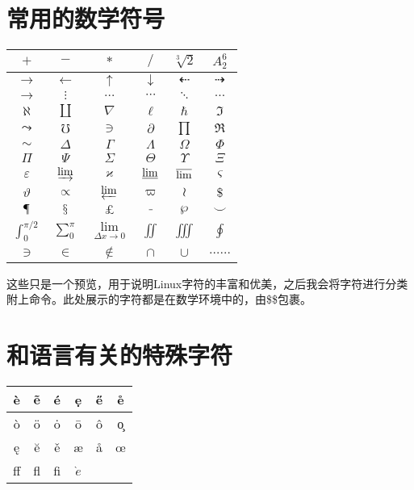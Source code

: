 \documentclass[10pt,a4paper]{article}
\begin{document}
	\section{常用的数学符号}
	\begin{center}
		\begin{tabular}{|c|c|c|c|c|c|}
		\hline
	$ + $			&$ - $  			&$ * $  		&$ / $  		&$ \sqrt[3]{2} $  		&$ A_2^6 $  			\\
		\hline
	$ \rightarrow $	&$ \leftarrow $  	&$ \uparrow $  	&$ \downarrow $ &$ \dashleftarrow $  	&$ \dashrightarrow $  	\\
		\hline
	$ \to $			&$ \vdots $  		&$ \ldots $  	&$\cdots$  		&$\ddots$  				&$ \dots $  			\\
		\hline
	$ \aleph $		& $ \amalg $ 		& $ \nabla $ 	& $ \ell $ 		&$ \hbar $  			& $ \Im $ 				\\
		\hline
	$\leadsto$		& $ \mho $ 			& $ \ni $ 		& $ \partial $ 	& $ \prod $ 			& $ \Re $ 				\\
		\hline
	$ \sim $		&$ \varDelta $  	& $ \varGamma $ & $ \varLambda $&$ \varOmega $  		&$ \varPhi $  			\\
		\hline
	$ \varPi $		& $ \varPsi $ 		& $ \varSigma $ & $ \varTheta $ & $ \varUpsilon $ 		& $ \varXi $ 			\\
		\hline
	$ \varepsilon $	& $ \varinjlim $ 	& $ \varkappa $ & $ \varliminf $& $ \varlimsup $ 		& $ \varsigma $ 		\\
		\hline
	$ \vartheta $	& $ \varpropto $ 	& $ \varprojlim $ & $ \varpi $ 	& $ \wr $ 				& $ \mathdollar $ 		\\
		\hline
	$\mathparagraph$& $ \mathsection $ 	& $ \mathsterling$& $ \mathunderscore $ & $ \wp $ 		& $ \smile $ 			\\
		\hline
	$ \int_{0}^{\pi/2} $	& $ \sum_{0}^{\pi} $ & $ \lim\limits_{\Delta x \rightarrow 0} $ & $ \iint $ & $ \iiint $ & $ \oint $ \\
		\hline
	$ \owns $ 		& $ \in $ 			& $ \notin $ 		& $ \cap $ 	& $ \cup $				& $ \dots\dots $		\\
		\hline
	\end{tabular}
	\end{center}

	这些只是一个预览，用于说明Linux字符的丰富和优美，之后我会将字符进行分类附上命令。此处展示的字符都是在数学环境中的，由\$\$包裹。
	\section{和语言有关的特殊字符}
	\begin{center}
		\begin{tabular}{|c|c|c|c|c|c|}
			\hline
			 \`e 	& \~e 	& \'e 	&\d{e}	&\H{e}	&\r{e}	\\
			\hline
			\`o		&\"o	&\.o	&\=o	&\^o	&\c{o}	\\
			\hline
			\k{e}	&\u{e}	&\v{e}	&\ae	&\aa	&\oe	\\
			\hline
			ff		&fl		&fi		&$\grave{e}$	&&		\\
			\hline
		\end{tabular}
	\end{center}
\end{document}
